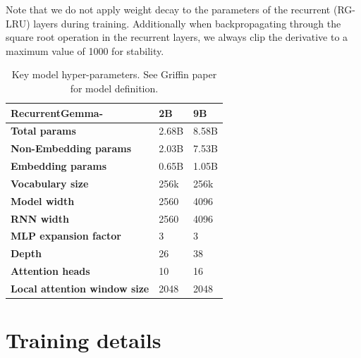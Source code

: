\documentclass[9pt, a4paper, logo, twocolumn, copyright, nonumbering]{googledeepmind}
\begin{document}
Note that we do not apply weight decay to the parameters of the recurrent (RG-LRU) layers during training. Additionally when backpropagating through the square root operation in the recurrent layers, we always clip the derivative to a maximum value of 1000 for stability.

\begin{table}[t!]
\caption{Key model hyper-parameters. See Griffin paper \citep{de2024griffin} for model definition.}
\begin{tabular}{lll}
\toprule
\textbf{RecurrentGemma-} & \textbf{2B} & \textbf{9B} \\
\midrule
\textbf{Total params} & 2.68B & 8.58B \\
\textbf{Non-Embedding params} & 2.03B & 7.53B \\
\textbf{Embedding params} & 0.65B & 1.05B \\ \midrule
\textbf{Vocabulary size} & 256k & 256k \\
\textbf{Model width} & 2560 & 4096 \\
\textbf{RNN width} & 2560 & 4096 \\
\textbf{MLP expansion factor} & 3 & 3 \\
\textbf{Depth} & 26 & 38 \\
\textbf{Attention heads} & 10 & 16 \\
\textbf{Local attention window size} & 2048 & 2048 \\
\bottomrule
\end{tabular} \label{table:hypers}
\end{table}



\section{Training details}
\end{document}

